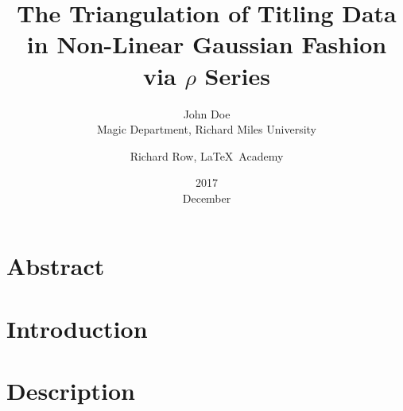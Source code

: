 \documentclass[12pt]{article}
\title{The Triangulation of Titling Data in Non-Linear Gaussian Fashion via $\rho$ Series}
\date{2017\\ December}
\author{John Doe\\ Magic Department, Richard Miles University 
\and Richard Row, \LaTeX\ Academy}
\begin{document}
\maketitle

\section*{Abstract}


\section{Introduction}


\section{Description}

\end{document}

